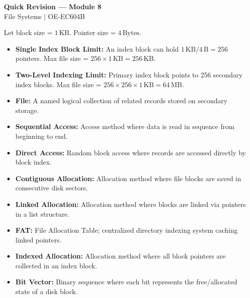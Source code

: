 \documentclass[12pt,a4paper]{article}
\begin{document}
\newpage
\begin{center}
  {\large\bfseries\color{myred} Quick Revision --- Module 8}\\[3pt]
  {\small\color{mydark} File Systems $|$ OE-EC604B}
\end{center}
\noindent{\color{myred}\rule{\linewidth}{1.2pt}}
\vspace{4pt}

\begin{tcolorbox}[formulabox, title={\textbf{File Allocation Calculations}}]
Let block size = $1\,\text{KB}$. Pointer size = $4\,\text{Bytes}$.
\begin{itemize}[leftmargin=*, itemsep=3pt]
  \item \textbf{Single Index Block Limit:} An index block can hold $1\,\text{KB} / 4\,\text{B} = 256$ pointers. Max file size = $256 \times 1\,\text{KB} = 256\,\text{KB}$.
  \item \textbf{Two-Level Indexing Limit:} Primary index block points to 256 secondary index blocks. Max file size = $256 \times 256 \times 1\,\text{KB} = 64\,\text{MB}$.
\end{itemize}
\end{tcolorbox}

\begin{tcolorbox}[defbox, title={\textbf{One-Line Definitions}}]
\begin{itemize}[leftmargin=*, itemsep=2.5pt, topsep=0pt]
  \item \textbf{File:} A named logical collection of related records stored on secondary storage.
  \item \textbf{Sequential Access:} Access method where data is read in sequence from beginning to end.
  \item \textbf{Direct Access:} Random block access where records are accessed directly by block index.
  \item \textbf{Contiguous Allocation:} Allocation method where file blocks are saved in consecutive disk sectors.
  \item \textbf{Linked Allocation:} Allocation method where blocks are linked via pointers in a list structure.
  \item \textbf{FAT:} File Allocation Table; centralized directory indexing system caching linked pointers.
  \item \textbf{Indexed Allocation:} Allocation method where all block pointers are collected in an index block.
  \item \textbf{Bit Vector:} Binary sequence where each bit represents the free/allocated state of a disk block.
\end{itemize}
\end{tcolorbox}
\end{document}
